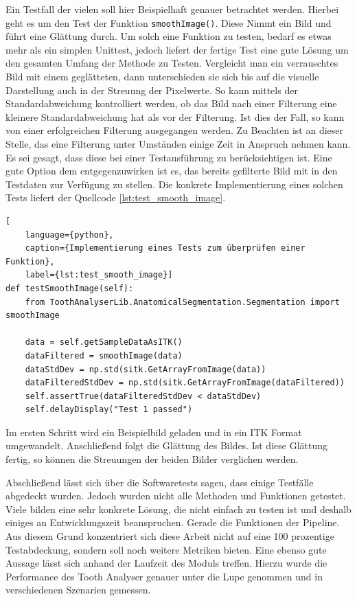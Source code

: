 Ein Testfall der vielen soll hier Beispielhaft genauer betrachtet werden. Hierbei
geht es um den Test der Funktion \texttt{smoothImage()}. Diese Nimmt ein Bild und
führt eine Glättung durch. Um solch eine Funktion zu testen, bedarf es etwas mehr
als ein simplen Unittest, jedoch liefert der fertige Test eine gute Lösung um
den gesamten Umfang der Methode zu Testen. Vergleicht man ein verrauschtes Bild mit
einem geglätteten, dann unterschieden sie sich bis auf die visuelle Darstellung
auch in der Streuung der Pixelwerte. So kann mittels der Standardabweichung kontrolliert
werden, ob das Bild nach einer Filterung eine kleinere Standardabweichung hat
als vor der Filterung. Ist dies der Fall, so kann von einer erfolgreichen
Filterung ausgegangen werden. Zu Beachten ist an dieser Stelle, das eine
Filterung unter Umständen einige Zeit in Anspruch nehmen kann. Es sei gesagt,
dass diese bei einer Testausführung zu berücksichtigen ist. Eine gute Option dem
entgegenzuwirken ist es, das bereits gefilterte Bild mit in den Testdaten zur
Verfügung zu stellen. Die konkrete Implementierung eines solchen Tests liefert der
Quellcode \ref{lst:test_smooth_image}.

\begin{lstlisting}[
    language={python},
    caption={Implementierung eines Tests zum überprüfen einer Funktion},
    label={lst:test_smooth_image}]
def testSmoothImage(self):
    from ToothAnalyserLib.AnatomicalSegmentation.Segmentation import smoothImage
   
    data = self.getSampleDataAsITK()
    dataFiltered = smoothImage(data)
    dataStdDev = np.std(sitk.GetArrayFromImage(data))
    dataFilteredStdDev = np.std(sitk.GetArrayFromImage(dataFiltered))
    self.assertTrue(dataFilteredStdDev < dataStdDev)
    self.delayDisplay("Test 1 passed")
\end{lstlisting}

Im ersten Schritt wird ein Beispielbild geladen und in ein \ac{ITK} Format umgewandelt.
Anschließend folgt die Glättung des Bildes. Ist diese Glättung fertig, so können
die Streuungen der beiden Bilder verglichen werden.

Abschließend lässt sich über die Softwaretests sagen, dass einige Testfälle abgedeckt
wurden. Jedoch wurden nicht alle Methoden und Funktionen getestet. Viele bilden eine
sehr konkrete Lösung, die nicht einfach zu testen ist und deshalb einiges an
Entwicklungszeit beanspruchen. Gerade die Funktionen der Pipeline. Aus diesem
Grund konzentriert sich diese Arbeit nicht auf eine 100 prozentige Testabdeckung,
sondern soll noch weitere Metriken bieten. Eine ebenso gute Aussage lässt sich
anhand der Laufzeit des Moduls treffen. Hierzu wurde die Performance des Tooth Analyser
genauer unter die Lupe genommen und in verschiedenen Szenarien gemessen.


